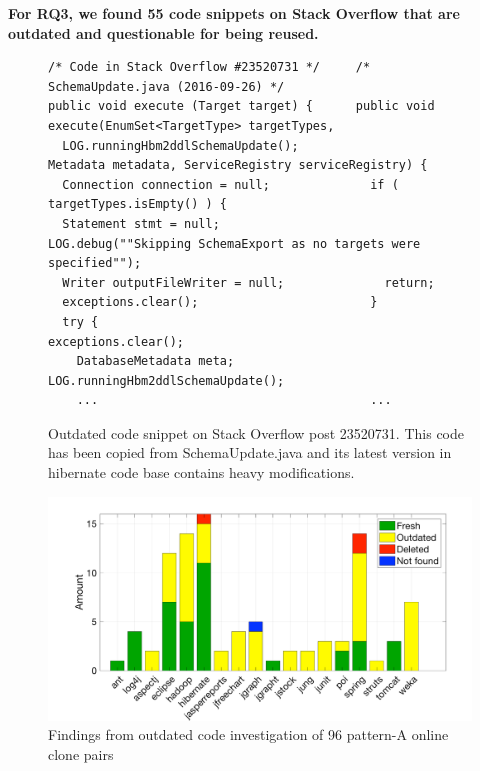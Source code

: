 \documentclass{sig-alternate-05-2015}
\begin{document}
\textbf{For RQ3, we found 55 code snippets on Stack Overflow that are outdated and questionable for being reused.}

\begin{figure}
	\begin{lstlisting}
/* Code in Stack Overflow #23520731 */     /* SchemaUpdate.java (2016-09-26) */
public void execute (Target target) {      public void execute(EnumSet<TargetType> targetTypes, 
  LOG.runningHbm2ddlSchemaUpdate();                        Metadata metadata, ServiceRegistry serviceRegistry) {
  Connection connection = null;              if ( targetTypes.isEmpty() ) {
  Statement stmt = null;                       LOG.debug(""Skipping SchemaExport as no targets were specified"");
  Writer outputFileWriter = null;              return;
  exceptions.clear();                        }
  try {                                      exceptions.clear();
    DatabaseMetadata meta;                   LOG.runningHbm2ddlSchemaUpdate();
    ...                                      ...
	\end{lstlisting}
	\caption{Outdated code snippet on Stack Overflow post 23520731. This code has been copied from SchemaUpdate.java and its latest version in hibernate code base contains heavy modifications.}
	\label{fig:hibernate_outdated_code}
\end{figure}

\begin{figure}
	\centering
	\includegraphics[width=\linewidth]{outdated}
	\caption{Findings from outdated code investigation of 96 pattern-A online clone pairs}
	\label{fig:outdated}
\end{figure}
\end{document}
